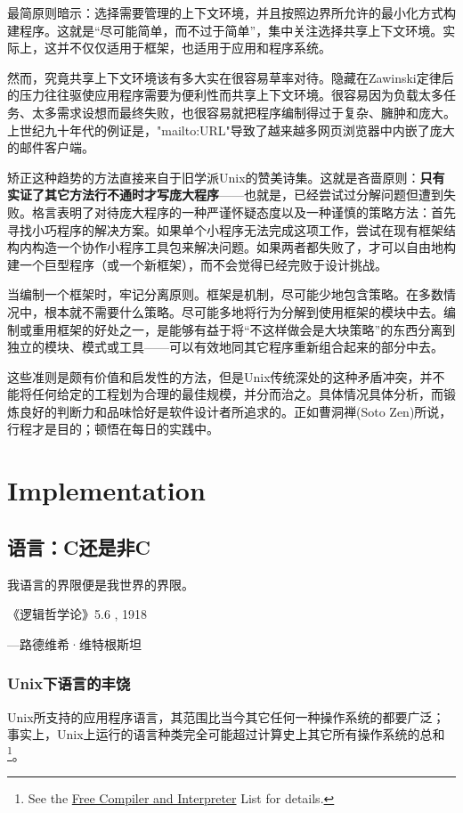 \documentclass[12pt,oneside]{ctexbook}
\begin{document}
\begin{common-format}
最简原则暗示：选择需要管理的上下文环境，并且按照边界所允许的最小化方式构建程序。这就是“尽可能简单，而不过于简单”，集中关注选择共享上下文环境。实际上，这并不仅仅适用于框架，也适用于应用和程序系统。

然而，究竟共享上下文环境该有多大实在很容易草率对待。隐藏在Zawinski定律后的压力往往驱使应用程序需要为便利性而共享上下文环境。很容易因为负载太多任务、太多需求设想而最终失败，也很容易就把程序编制得过于复杂、臃肿和庞大。上世纪九十年代的例证是，"mailto:URL"导致了越来越多网页浏览器中内嵌了庞大的邮件客户端。

矫正这种趋势的方法直接来自于旧学派Unix的赞美诗集。这就是吝啬原则：\textbf{只有实证了其它方法行不通时才写庞大程序}——也就是，已经尝试过分解问题但遭到失败。格言表明了对待庞大程序的一种严谨怀疑态度以及一种谨慎的策略方法：首先寻找小巧程序的解决方案。如果单个小程序无法完成这项工作，尝试在现有框架结构内构造一个协作小程序工具包来解决问题。如果两者都失败了，才可以自由地构建一个巨型程序（或一个新框架），而不会觉得已经完败于设计挑战。

当编制一个框架时，牢记分离原则。框架是机制，尽可能少地包含策略。在多数情况中，根本就不需要什么策略。尽可能多地将行为分解到使用框架的模块中去。编制或重用框架的好处之一，是能够有益于将“不这样做会是大块策略”的东西分离到独立的模块、模式或工具——可以有效地同其它程序重新组合起来的部分中去。

这些准则是颇有价值和启发性的方法，但是Unix传统深处的这种矛盾冲突，并不能将任何给定的工程划为合理的最佳规模，并分而治之。具体情况具体分析，而锻炼良好的判断力和品味恰好是软件设计者所追求的。正如曹洞禅(Soto Zen)所说，行程才是目的；顿悟在每日的实践中。


\part{Implementation}
\chapter{语言：C还是非C}
\begin{flushright}
\begin{notecard}{15em}
我语言的界限便是我世界的界限。

{\hfill 《逻辑哲学论》5.6 , 1918}

{\hfill —路德维希·维特根斯坦}
\end{notecard}
\end{flushright}

\section{Unix下语言的丰饶}
Unix所支持的应用程序语言，其范围比当今其它任何一种操作系统的都要广泛；事实上，Unix上运行的语言种类完全可能超过计算史上其它所有操作系统的总和\footnote{See the \href{ftp://ftp.idiom.com/pub/compilers-list/free-compilers}{Free Compiler and Interpreter} List for details.}。


\end{common-format}
\end{document}
